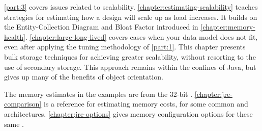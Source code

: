 

\autoref{part:3} covers issues related to scalability.
\autoref{chapter:estimating-scalability} teaches strategies for estimating
how a design will scale up as load increases.
It builds on the Entity-Collection Diagram and Bloat Factor introduced in
\autoref{chapter:memory-health}.
\autoref{chapter:large-long-lived} covers cases when your data model does not fit, even after
applying the tuning methodology of \autoref{part:1}. This chapter presents
bulk storage techniques for achieving greater scalability, without
resorting to the use of secondary storage. This approach remains
within the confines of Java, but gives up many of the benefits of object
orientation.

The memory estimates in the examples are from the 32-bit \oracle
\javasix \jre.
\autoref{chapter:jre-comparison} is a reference for estimating memory costs,
for some common \jres and architectures.
\autoref{chapter:jre-options} gives memory configuration options for these same
\jres.





